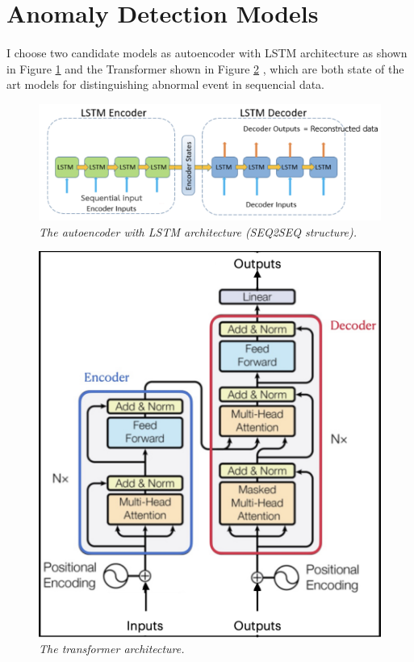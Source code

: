 \section{Anomaly Detection Models}
\paragraph{}
I choose two candidate models as autoencoder with LSTM architecture as shown in Figure \ref{fig:LSTM_metho} and the Transformer shown in Figure \ref{fig:transformer_metho} , which are both state of the art models for distinguishing abnormal event in sequencial data.

\begin{figure}[H]
  \centering
  \caption[The autoencoder with LSTM architecture (seq2seq structure).]{\emph{The autoencoder with LSTM architecture (SEQ2SEQ structure).}}\label{fig:LSTM_metho}
  \includegraphics[scale = 0.3]{figures/LSTM_metho.jpg}  
\end{figure}

\begin{figure}[H]
  \centering
  \caption[The transformer architecture.]{\emph{The transformer architecture. \\}}\label{fig:transformer_metho}
  \includegraphics[scale = 0.2]{figures/transformer_metho2.jpg}  
\end{figure}

